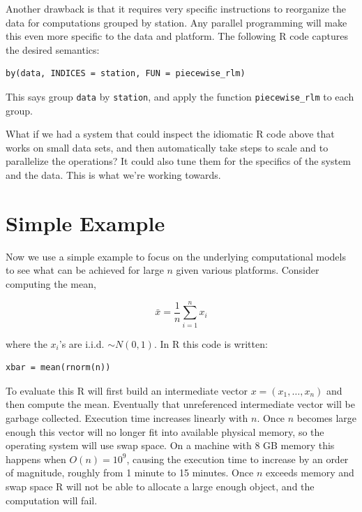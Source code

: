 \documentclass[12pt]{article}
\begin{document}
Another drawback is that it requires very specific instructions to
reorganize the data for computations grouped by station. Any parallel
programming will make this even more specific to the data and platform. The
following R code captures the desired semantics:

\begin{verbatim}
by(data, INDICES = station, FUN = piecewise_rlm)
\end{verbatim}

This says group \texttt{data} by \texttt{station}, and apply the
function \texttt{piecewise\_rlm} to each group.

What if we had a system that could inspect the idiomatic R code above that
works on small data sets, and then automatically take steps to scale and to
parallelize the operations? It could also tune them for the specifics of
the system and the data. This is what we're working towards.


\section{Simple Example}


Now we use a simple example to focus on the underlying computational models
to see what can be achieved for large $n$ given various platforms.
Consider computing the mean,

\begin{equation}
    \bar{x} = \frac{1}{n} \sum_{i = 1}^n x_i
\label{eq:mean}
\end{equation}

where the $x_i$'s are
i.i.d. $\sim N(0, 1)$.  In R this code is written:

\begin{verbatim}
xbar = mean(rnorm(n))
\end{verbatim}

To evaluate this R will first build an intermediate vector $x = (x_1,
\dots, x_n)$ and then compute the mean. Eventually that unreferenced
intermediate vector will be garbage collected.
Execution time increases
linearly with $n$. Once $n$ becomes large
enough this vector will no longer fit into available physical memory, so
the operating system will use swap space. On a machine with 8 GB memory
this happens when $O(n) = 10^9$, causing the execution time
to increase by an order of magnitude, roughly from 1 minute to 15
minutes. Once $n$ exceeds memory and swap space R will not be able to allocate a
large enough object, and the computation will fail.
\end{document}
